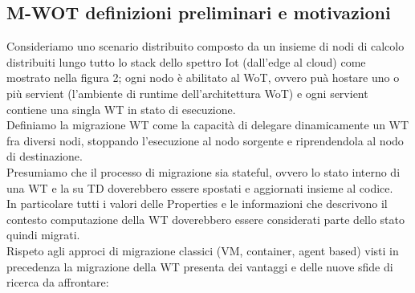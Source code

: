 \documentclass[11pt]{article}
\begin{document}
	\subsection{M-WOT definizioni preliminari e motivazioni}
	Consideriamo uno scenario distribuito composto da un insieme di nodi di calcolo distribuiti lungo tutto lo stack dello spettro Iot (dall'edge al cloud) come mostrato nella figura 2; ogni nodo è abilitato al WoT, ovvero puà hostare uno o più servient (l'ambiente di runtime dell'architettura WoT) e ogni servient contiene una singla WT in stato di esecuzione. \\
	Definiamo la migrazione WT come la capacità di delegare dinamicamente un WT fra diversi nodi, stoppando l'esecuzione al nodo sorgente e riprendendola al nodo di destinazione. \\
	Presumiamo che il processo di migrazione sia stateful, ovvero lo stato interno di una WT e la su TD doverebbero essere spostati e aggiornati insieme al codice. \\
	In particolare tutti i valori delle Properties e le informazioni che descrivono il contesto computazione della WT doverebbero essere considerati parte dello stato quindi migrati. \\
	Rispeto agli approci di migrazione classici (VM, container, agent based) visti in precedenza la migrazione della WT presenta dei vantaggi e delle nuove sfide di ricerca da affrontare:
\end{document}
